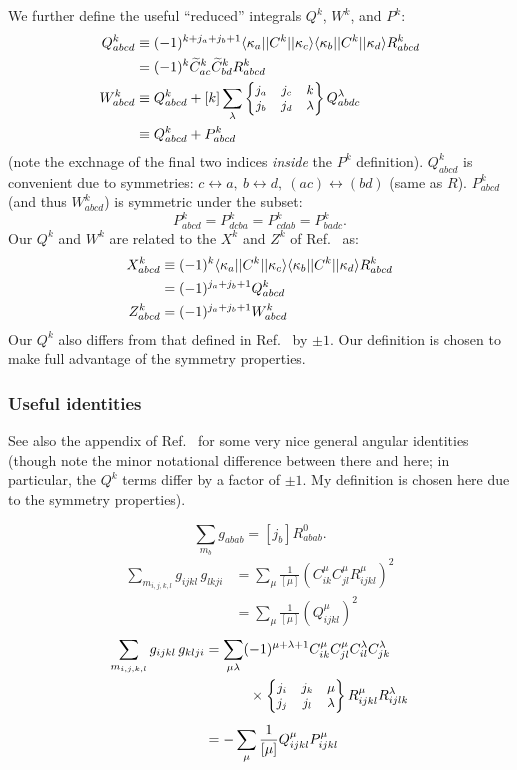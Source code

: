 \documentclass[10pt,twocolumn,a4paper]{article}%
\newcommand{\bra}[1]{\ensuremath{\langle #1|}}	%
\newcommand{\ket}[1]{\ensuremath{|#1\rangle}}	%
\newcommand{\sixj}[6]{\small\ensuremath{\begin{Bmatrix}#1&#2&#3\\#4&#5&#6\end{Bmatrix}}}	%
\newcommand{\be}{\begin{equation}}
\newcommand{\ee}{\end{equation}}
\renewcommand{\k}{\ensuremath{\kappa}}
\begin{document}
We further define the useful ``reduced'' integrals $Q^k$, $W^k$, and $P^k$:
\begin{align}
Q^k_{abcd} &\equiv  (-1)^{k + j_a+j_b+1}\bra{\k_a}|C^k|\ket{\k_c} \bra{\k_b}|C^k|\ket{\k_d} R^k_{abcd} \notag\\
&= (-1)^k \widetilde C^k_{ac}\widetilde C^k_{bd}R^k_{abcd}\\
%
W^k_{abcd} &\equiv Q^k_{abcd} + [k] \sum_\lambda \sixj{j_a}{j_c}{k}{j_b}{j_d}{\lambda}Q^\lambda_{abdc} \notag\\
& \equiv Q^k_{abcd}  + P^k_{abcd}
\end{align}
(note the exchnage of the final two indices {\em inside} the $P^k$ definition).
$Q^k_{abcd}$  is convenient due to symmetries: $c\leftrightarrow a ,~ b\leftrightarrow d  ,~ (ac)\leftrightarrow (bd)$ (same as $R$).
$P^k_{abcd}$ (and thus $W^k_{abcd}$) is symmetric under the subset:
\be
P^k_{abcd} = P^k_{dcba} = P^k_{cdab} = P^k_{badc}.
\ee
%
Our $Q^k$ and $W^k$ are related to the $X^k$ and $Z^k$ of Ref.~\cite{Lindgren1986} as:
\begin{align}
X^k_{abcd} &\equiv  (-1)^k \bra{\k_a}|C^k|\ket{\k_c} \bra{\k_b}|C^k|\ket{\k_d} R^k_{abcd} \notag\\
 & = (-1)^{j_a+j_b+1}Q^k_{abcd}\\
 Z^k_{abcd} &=  (-1)^{j_a+j_b+1} W^k_{abcd}
\end{align}
Our $Q^k$ also differs from that defined in Ref.~\cite{DzubaHFS1984} by $\pm1$.
Our definition is chosen to make full advantage of the symmetry properties.

\subsubsection*{Useful identities}


See also the appendix of Ref.~\cite{DzubaHFS1984} for some very nice general angular identities (though note the minor notational difference between there and here; in particular, the $Q^k$ terms differ by a factor of $\pm1$. My definition is chosen here due to the symmetry properties).

\be
\sum_{m_b}g_{abab} = [j_b] R^0_{abab}.
\ee
%
\begin{align}
\sum_{m_{i,j,k,l}}  g_{ijkl} \, g_{lkji}
    &= \sum_\mu \frac{1}{[\mu]} \left( C^\mu_{ik}C^\mu_{jl} R^\mu_{ijkl}\right)^2 \\
    &= \sum_\mu \frac{1}{[\mu]} \left( Q^\mu_{ijkl}\right)^2 
\end{align}
\begin{align}
\sum_{m_{i,j,k,l}}  g_{ijkl} \, g_{klji}
    &=\sum_{\mu \lambda}(-1)^{\mu+\lambda+1}C^\mu_{ik}C^\mu_{jl}C^\lambda_{il}C^\lambda_{jk} \notag \\
    &\phantom{=\sum_{\mu \lambda}}~~\times \sixj{j_i}{j_k}{\mu}{j_j}{j_l}{\lambda}R^\mu_{ijkl}R^\lambda_{ijlk} \\
    &=-\sum_\mu \frac{1}{[\mu]}  Q^\mu_{ijkl}P^\mu_{ijkl}
\end{align}
\end{document}
